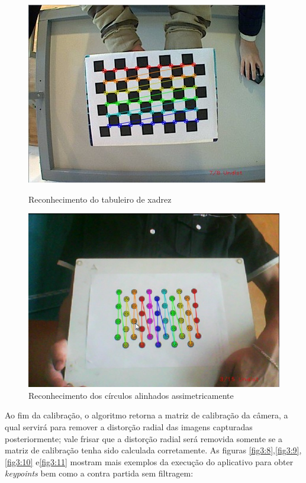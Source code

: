 \begin{figure}[!hb]
  \includegraphics[width=\linewidth]{Imagens/figura3-6.jpg}
  \caption{Reconhecimento do tabuleiro de xadrez}\label{fig3:6}
\endminipage\hfill
{}
  \includegraphics[width=\linewidth]{Imagens/figura3-7.jpg}
  \caption{Reconhecimento dos círculos alinhados assimetricamente}\label{fig3:7}
\endminipage
\end{figure}

Ao fim da calibração, o algoritmo retorna a matriz de calibração da câmera, a qual servirá para remover a distorção radial das imagens capturadas posteriormente; vale frisar que a distorção radial será removida somente se  a matriz de calibração tenha sido calculada corretamente. As figuras \ref{fig3:8},\ref{fig3:9},\ref{fig3:10}	 e\ref{fig3:11} mostram mais exemplos da execução do aplicativo para obter \textit{keypoints} bem como a contra partida sem filtragem:

